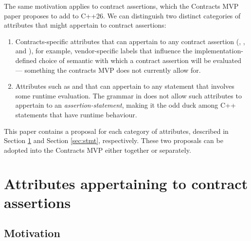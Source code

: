 The same motivation applies to contract assertions, which the Contracts MVP paper \cite{P2900R5} proposes to add to C++26. We can distinguish two distinct categories of attributes that might appertain to contract assertions:

\begin{enumerate}
\item Contracts-specific attributes that can appertain to any contract assertion (, , and ), for example, vendor-specific labels that influence the implementation-defined choice of semantic with which a contract assertion will be evaluated --- something the contracts MVP does not currently allow for.

\item Attributes such as \tcode{[[likely]]} and \tcode{[[unlikely]]} that can appertain to any statement that involves some runtime evaluation. The grammar in \cite{P2900R5} does not allow such attributes to appertain to an \emph{assertion-statement}, making it the odd duck among C++ statements that have runtime behaviour.
\end{enumerate}

This paper contains a proposal for each category of attributes, described in Section \ref{sec:labels} and Section \ref{sec:stmt}, respectively. These two proposals can be adopted into the Contracts MVP either together or separately.


\section{Attributes appertaining to contract assertions}
\label{sec:labels}
 
 \subsection{Motivation}
 
